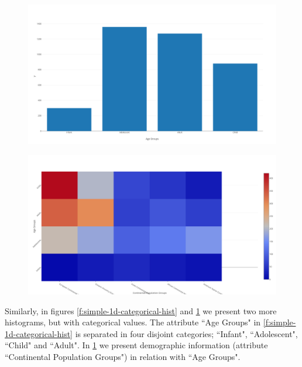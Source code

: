 \begin{figure}[t]
\centering
\begin{minipage}{.5\textwidth}
  \centering
  \includegraphics[width=\columnwidth]{figures/AgeGroups.png}
  \label{f:simple-1d-categorical-hist}
\end{minipage}%
\begin{minipage}{.5\textwidth}
  \centering
  \includegraphics[width=\columnwidth]{figures/AgeGroups_PopulationGroups.png}
  \label{f:simple-2d-categorical-hist}
\end{minipage}
\end{figure}


Similarly, in figures \ref{f:simple-1d-categorical-hist} and \ref{f:simple-2d-categorical-hist} we present two more histograms, but with categorical values.
The attribute ``Age Groups" in \ref{f:simple-1d-categorical-hist} is separated in four disjoint categories; ``Infant", ``Adolescent", ``Child" and ``Adult".
In \ref{f:simple-2d-categorical-hist} we present demographic information (attribute ``Continental Population Groups") in relation with ``Age Groups".





